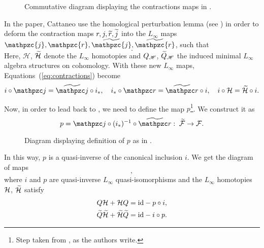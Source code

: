 \begin{figure}
    \centering
    
    \caption{Commutative diagram displaying the contractions maps in .}
    \label{fig:contractions_diagram}
\end{figure}

In the paper, Cattaneo \etal use the homological perturbation lemma (see \cite[Section 6.4]{Hom_mirror_trasnfer_lemma}) in order to deform the contraction maps $r, j, \widetilde{r}, \widetilde{j}$ into the $L_\infty$ maps $\mathpzc{j}, \mathpzc{r}, \wt{\mathpzc{j}}, \wt{\mathpzc{r}}$, such that
\begin{equation}
     .
\end{equation}
Here, $\mathcal{H}$, $\widetilde{\mathcal{H}}$ denote the $L_\infty$ homotopies and $Q_{\mathscr{H}}$, $\widetilde{Q}_{\mathscr{H}}$ the induced minimal $L_\infty$ algebra structures on cohomology.
With these new $L_\infty$ maps, Equations~(\ref{eq:contractions}) become
\begin{equation}
    i \circ \cazz{j} = \wt{\cazz{j}} \circ i_*, \quad
    i_* \circ \cazz{r} = \wt{\cazz{r}} \circ i, \quad
    i \circ \mc{H} = \wt{\mc{H}} \circ i .
\end{equation}

Now, in order to lead back to , we need to define the map $p$\footnote{Step taken from \cite[Section 10.4.6]{Algebraic_operands_key_step}, as the authors write.}.
We construct it as
\begin{equation}
\label{eq:def_p}
    p = \cazz{j} \circ (i_*)^{-1} \circ \wt{\cazz{r}}:
    \; \wt{\F} \rightarrow \F .
\end{equation}
\begin{figure}
    \centering
    
    \caption{Diagram displaying definition of $p$ as in .}
    \label{fig:comm_diagram_def_p}
\end{figure}
In this way, $p$ is a quasi-inverse of the canonical inclusion $i$.
We get the diagram of maps
\begin{equation}
    ,
\end{equation}
where $i$ and $p$ are quasi-inverse $L_\infty$ quasi-isomorphisms and the $L_\infty$ homotopies $\mathcal{H}$, $\widetilde{\mathcal{H}}$ satisfy
\begin{equation}
\label{eq:L_infty_homotopies}
    \begin{aligned}
        Q \mathcal{H} + \mathcal{H} Q =&
        \; \text{id} - p \circ i , \\
        \widetilde{Q} \widetilde{\mathcal{H}} + \widetilde{\mathcal{H}} \widetilde{Q} =&
        \; \text{id} - i \circ p .
    \end{aligned}
\end{equation}

